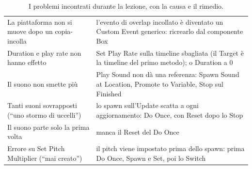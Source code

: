 \begin{table}[htbp]
\begin{tabular}{@{}p{5.4cm}p{8.6cm}@{}}
La piattaforma non si muove dopo un copia-incolla & l'evento di overlap incollato è
diventato un Custom Event generico: ricrearlo dal componente Box \\
Duration e play rate non hanno effetto & Set Play Rate sulla timeline sbagliata (il
Target è la timeline del primo metodo); o Duration a 0 \\
Il suono non smette più & Play Sound non dà una referenza: Spawn Sound at Location,
Promote to Variable, Stop sul Finished \\
Tanti suoni sovrapposti (``uno stormo di uccelli'') & lo spawn sull'Update scatta a ogni
aggiornamento: Do Once, con Reset dopo lo Stop \\
Il suono parte solo la prima volta & manca il Reset del Do Once \\
Errore su Set Pitch Multiplier (``mai creato'') & il pitch viene impostato prima dello
spawn: prima Do Once, Spawn e Set, poi lo Switch \\
\bottomrule
\end{tabular}
\caption{I problemi incontrati durante la lezione, con la causa e il rimedio.}
\label{ue6:tab:errori}
\end{table}

